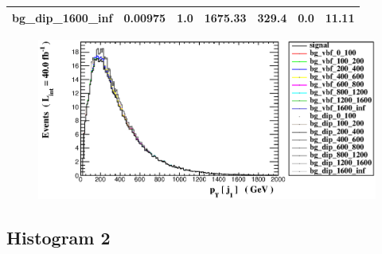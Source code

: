 \documentclass[a4paper, 10pt]{article}
\begin{document}
\begin{table}[H]
\begin{center}
\begin{tabular}{|m{23.0mm}|m{23.0mm}|m{18.0mm}|m{19.0mm}|m{19.0mm}|m{19.0mm}|m{19.0mm}|}
      \hline
      {\cellcolor{white}         bg\_dip\_1600\_inf}& {\cellcolor{white}         0.00975}& {\cellcolor{white}         1.0}& {\cellcolor{white}         1675.33}& {\cellcolor{white}         329.4}& {\cellcolor{orange}         0.0}& {\cellcolor{orange}         11.11}\\
\hline
    \end{tabular}
  \end{center}
\end{table}

\begin{figure}[H]
  \begin{center}
    \includegraphics[scale=0.45]{selection_0.eps}\\
\caption{   }
  \end{center}
\end{figure}
      \newpage
\subsection{ Histogram 2}
\end{document}

